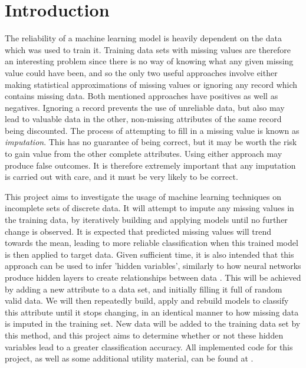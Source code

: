 \newpage
\chapter{Introduction}\label{intro}
The reliability of a machine learning model is heavily dependent on the data which was used to train it. Training data sets with missing values are therefore an interesting problem since there is no way of knowing what any given missing value could have been, and so the only two useful approaches involve either making statistical approximations of missing values or ignoring any record which contains missing data. Both mentioned approaches have positives as well as negatives. Ignoring a record prevents the use of unreliable data, but also may lead to valuable data in the other, non-missing attributes of the same record being discounted. The process of attempting to fill in a missing value is known as \textit{imputation}. This has no guarantee of being correct, but it may be worth the risk to gain value from the other complete attributes.  Using either approach may produce false outcomes. It is therefore extremely important that any imputation is carried out with care, and it must be very likely to be correct.

This project aims to investigate the usage of machine learning techniques on incomplete sets of discrete data. It will attempt to impute any missing values in the training data, by iteratively building and applying models until no further change is observed. It is expected that predicted missing values will trend towards the mean, leading to more reliable classification when this trained model is then applied to target data.  Given sufficient time, it is also intended that this approach can be used to infer 'hidden variables', similarly to how neural networks produce hidden layers to create relationships between data \cite{Touretzky:1989}. This will be achieved by adding a new attribute to a data set, and initially filling it full of random valid data. We will then repeatedly build, apply and rebuild models to classify this attribute until it stops changing, in an identical manner to how missing data is imputed in the training set. New data will be added to the training data set by this method, and this project aims to determine whether or not these hidden variables lead to a greater classification accuracy. All implemented code for this project, as well as some additional utility material, can be found at \cite{gitlab}.
